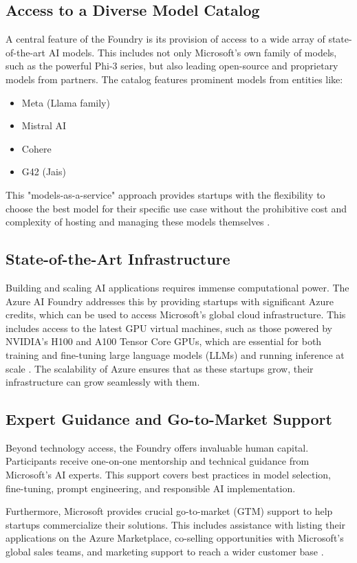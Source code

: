 \documentclass{article}
\begin{document}
\subsection{Access to a Diverse Model Catalog}
A central feature of the Foundry is its provision of access to a wide array of state-of-the-art AI models. This includes not only Microsoft's own family of models, such as the powerful Phi-3 series, but also leading open-source and proprietary models from partners. The catalog features prominent models from entities like:
\begin{itemize}
    \item Meta (Llama family)
    \item Mistral AI
    \item Cohere
    \item G42 (Jais)
\end{itemize}
This "models-as-a-service" approach provides startups with the flexibility to choose the best model for their specific use case without the prohibitive cost and complexity of hosting and managing these models themselves \citep{venturebeat_ai_2024}.

\subsection{State-of-the-Art Infrastructure}
Building and scaling AI applications requires immense computational power. The Azure AI Foundry addresses this by providing startups with significant Azure credits, which can be used to access Microsoft's global cloud infrastructure. This includes access to the latest GPU virtual machines, such as those powered by NVIDIA's H100 and A100 Tensor Core GPUs, which are essential for both training and fine-tuning large language models (LLMs) and running inference at scale \citep{azure_blog_2024}. The scalability of Azure ensures that as these startups grow, their infrastructure can grow seamlessly with them.

\subsection{Expert Guidance and Go-to-Market Support}
Beyond technology access, the Foundry offers invaluable human capital. Participants receive one-on-one mentorship and technical guidance from Microsoft's AI experts. This support covers best practices in model selection, fine-tuning, prompt engineering, and responsible AI implementation.

Furthermore, Microsoft provides crucial go-to-market (GTM) support to help startups commercialize their solutions. This includes assistance with listing their applications on the Azure Marketplace, co-selling opportunities with Microsoft's global sales teams, and marketing support to reach a wider customer base \citep{techcrunch_foundry_2024}.
\end{document}
